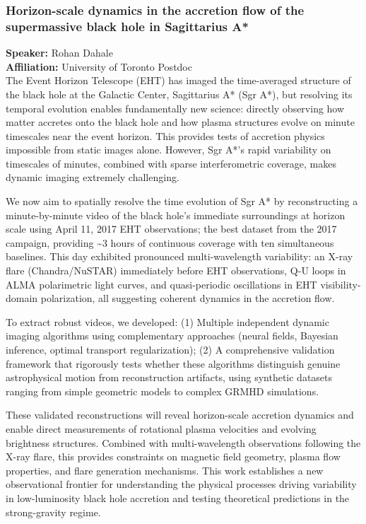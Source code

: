 \subsubsection*{Horizon-scale dynamics in the accretion flow of the supermassive black hole in Sagittarius A*}
\textbf{Speaker:} Rohan Dahale \\
\textbf{Affiliation:} University of Toronto \textperiodcentered{} Postdoc\\
The Event Horizon Telescope (EHT) has imaged the time-averaged structure of the black hole at the Galactic Center, Sagittarius A* (Sgr A*), but resolving its temporal evolution enables fundamentally new science: directly observing how matter accretes onto the black hole and how plasma structures evolve on minute timescales near the event horizon. This provides tests of accretion physics impossible from static images alone. However, Sgr A*'s rapid variability on timescales of minutes, combined with sparse interferometric coverage, makes dynamic imaging extremely challenging.

We now aim to spatially resolve the time evolution of Sgr A* by reconstructing a minute-by-minute video of the black hole's immediate surroundings at horizon scale using April 11, 2017 EHT observations; the best dataset from the 2017 campaign, providing \textasciitilde{}3 hours of continuous coverage with ten simultaneous baselines. This day exhibited pronounced multi-wavelength variability: an X-ray flare (Chandra/NuSTAR) immediately before EHT observations, Q-U loops in ALMA polarimetric light curves, and quasi-periodic oscillations in EHT visibility-domain polarization, all suggesting coherent dynamics in the accretion flow.

To extract robust videos, we developed: (1) Multiple independent dynamic imaging algorithms using complementary approaches (neural fields, Bayesian inference, optimal transport regularization); (2) A comprehensive validation framework that rigorously tests whether these algorithms distinguish genuine astrophysical motion from reconstruction artifacts, using synthetic datasets ranging from simple geometric models to complex GRMHD simulations.

These validated reconstructions will reveal horizon-scale accretion dynamics and enable direct measurements of rotational plasma velocities and evolving brightness structures. Combined with multi-wavelength observations following the X-ray flare, this provides constraints on magnetic field geometry, plasma flow properties, and flare generation mechanisms. This work establishes a new observational frontier for understanding the physical processes driving variability in low-luminosity black hole accretion and testing theoretical predictions in the strong-gravity regime.

